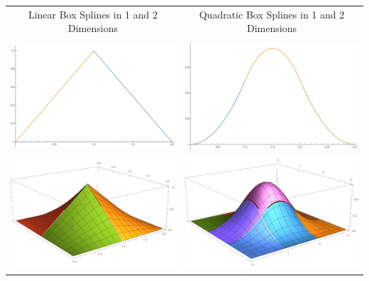 \documentclass[11pt,margin=1in]{article}
\begin{document}
\begin{table}[!htbp]
\centering
\begin{tabular}{cc}
  Linear Box Splines in 1 and 2 Dimensions & Quadratic Box Splines in 1 and 2 Dimensions \\

  \vspace{1mm} & \\

  \includegraphics[width=7cm]{Linear_1D} & \includegraphics[width=7cm]{Quadratic_1D} \\
  \includegraphics[width=7cm]{Linear_2D} & \includegraphics[width=7cm]{Quadratic_2D}   

\end{tabular}
\end{table}
\end{document}
